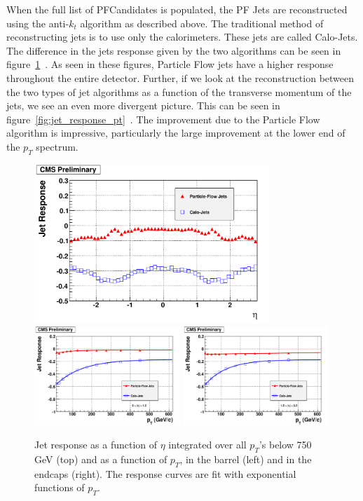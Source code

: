 When the full list of PFCandidates is populated, the PF Jets are reconstructed using the anti-$k_t$ algorithm as described above.  The traditional method of reconstructing jets is to use only the calorimeters.  These jets are called Calo-Jets. The difference in the jets response given by the two algorithms can be seen in figure~\ref{fig:jet_response}~\cite{particleflow}. As seen in these figures, Particle Flow jets have a higher response throughout the entire detector.  Further, if we look at the reconstruction between the two types of jet algorithms as a function of the transverse momentum of the jets, we see an even more divergent picture.  This can be seen in figure~\ref{fig:jet_response_pt}~\cite{particleflow}. The improvement due to the Particle Flow algorithm is impressive, particularly the large improvement at the lower end of the $p_T$ spectrum.

\begin{figure}
\begin{center}
\includegraphics[width=0.79\textwidth]{Reconstruction/Figure_008-a-rotated90.pdf}\\
\includegraphics[width=0.49\textwidth]{Reconstruction/Figure_008-b-rotated90.pdf}
\includegraphics[width=0.49\textwidth]{Reconstruction/Figure_008-c-rotated90.pdf}
\caption{Jet response as a function of $\eta$ integrated over all $p_T$'s below 750 GeV (top) and as a function of $p_T$, in the barrel (left) and in the endcaps (right). The response curves are fit with exponential functions of $p_T$.~\cite{particleflow}}
\label{fig:jet_response}
\end{center}
\end{figure}


